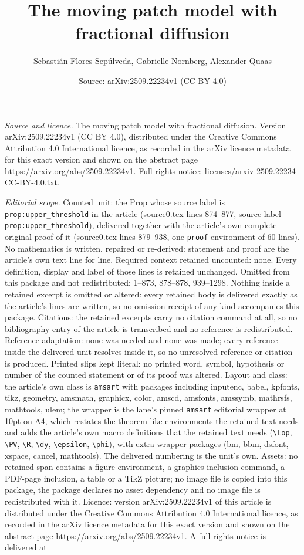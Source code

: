 \documentclass[10pt,a4paper]{amsart}
\title[The moving patch model with fractional diffusion]{The moving patch model with fractional diffusion}
\author{Sebasti\'an Flores-Sep\'ulveda, Gabrielle Nornberg, Alexander Quaas}
\date{Source: arXiv:2509.22234v1 (CC BY 4.0)}
\begin{document}
\maketitle

\noindent\emph{Source and licence.} The moving patch model with fractional diffusion. Version arXiv:2509.22234v1 (CC BY 4.0), distributed under the Creative Commons Attribution 4.0 International licence, as recorded in the arXiv licence metadata for this exact version and shown on the abstract page https://arxiv.org/abs/2509.22234v1. Full rights notice: licenses/arxiv-2509.22234-CC-BY-4.0.txt.\par\smallskip

\noindent\textit{Editorial scope.} Counted unit: the Prop whose source label is \texttt{prop:upper\_threshold} in the article (source0.tex lines 874--877, source label \texttt{prop:upper\_threshold}), delivered together with the article's own complete original proof of it (source0.tex lines 879--938, one \texttt{proof} environment of 60 lines). No mathematics is written, repaired or re-derived: statement and proof are the article's own text line for line. Required context retained uncounted: none. Every definition, display and label of those lines is retained unchanged. Omitted from this package and not redistributed: 1--873, 878--878, 939--1298. Nothing inside a retained excerpt is omitted or altered: every retained body is delivered exactly as the article's lines are written, so no omission receipt of any kind accompanies this package. Citations: the retained excerpts carry no citation command at all, so no bibliography entry of the article is transcribed and no reference is redistributed. Reference adaptation: none was needed and none was made; every reference inside the delivered unit resolves inside it, so no unresolved reference or citation is produced. Printed slips kept literal: no printed word, symbol, hypothesis or number of the counted statement or of its proof was altered. Layout and class: the article's own class is \texttt{amsart} with packages including inputenc, babel, kpfonts, tikz, geometry, amsmath, graphicx, color, amscd, amsfonts, amssymb, mathrsfs, mathtools, ulem; the wrapper is the lane's pinned \texttt{amsart} editorial wrapper at 10pt on A4, which restates the theorem-like environments the retained text needs and adds the article's own macro definitions that the retained text needs (\texttt{\textbackslash Lop}, \texttt{\textbackslash PV}, \texttt{\textbackslash R}, \texttt{\textbackslash dy}, \texttt{\textbackslash epsilon}, \texttt{\textbackslash phi}), with extra wrapper packages (bm, bbm, dsfont, xspace, cancel, mathtools). The delivered numbering is the unit's own. Assets: no retained span contains a figure environment, a graphics-inclusion command, a PDF-page inclusion, a table or a TikZ picture; no image file is copied into this package, the package declares no asset dependency and no image file is redistributed with it. Licence: version arXiv:2509.22234v1 of this article is distributed under the Creative Commons Attribution 4.0 International licence, as recorded in the arXiv licence metadata for this exact version and shown on the abstract page https://arxiv.org/abs/2509.22234v1. A full rights notice is delivered at 
\end{document}
